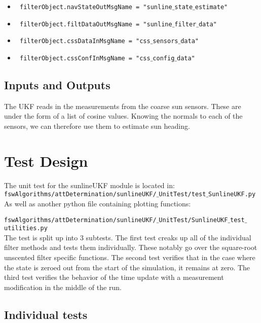 \documentclass[]{BasiliskReportMemo}
\begin{document}
\begin{itemize}
\item    \texttt{ filterObject.navStateOutMsgName = "sunline$\_$state$\_$estimate"}
\item    \texttt{ filterObject.filtDataOutMsgName = "sunline$\_$filter$\_$data"}
\item   \texttt{ filterObject.cssDataInMsgName = "css$\_$sensors$\_$data"}
\item   \texttt{ filterObject.cssConfInMsgName = "css$\_$config$\_$data"}
\end{itemize}

\subsection{Inputs and Outputs}

The UKF reads in the measurements from the coarse sun sensors. These are under the form of a list of cosine values. Knowing the normals to each of the sensors, we can therefore use them to estimate sun heading.

\section{Test Design}
The unit test for the sunlineUKF module is located in:\\

\noindent
{\tt fswAlgorithms/attDetermination/sunlineUKF/$\_$UnitTest/test$\_$SunlineUKF.py} \\

As well as another python file containing plotting functions:

\noindent
{\tt fswAlgorithms/attDetermination/sunlineUKF/$\_$UnitTest/SunlineUKF$\_$test$\_$utilities.py} \\

The test is split up into 3 subtests. The first test creaks up all of the individual filter methods and tests them individually. These notably go over the square-root unscented filter specific functions. The second test verifies that in the case where the state is zeroed out from the start of the simulation, it remains at zero. The third test verifies the behavior of the time update with a measurement modification in the middle of the run. 

\subsection{Individual tests}
\end{document}
